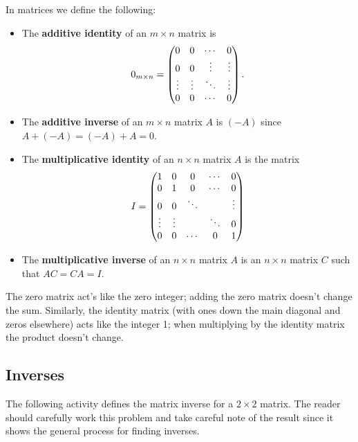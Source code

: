\begin{definition}
    In matrices we define the following:
    \begin{itemize}
        \item The {\bf additive identity} of an $m \times n$ matrix is
            \[ 0_{m\times n} = \begin{pmatrix} 0 & 0 & \cdots & 0 \\ 0 & 0 & \vdots & \vdots \\
            \vdots & \vdots & \ddots & \vdots \\ 0 & 0 & \cdots & 0 \end{pmatrix}. \]
        \item The {\bf additive inverse} of an $m \times n$ matrix $A$ is $(-A)$ since $A
            + (-A) = (-A) + A = 0$.
        \item The {\bf multiplicative identity} of an $n\times n$ matrix $A$ is the matrix 
            \[ I = \begin{pmatrix} 1 & 0 & 0 &\cdots & 0 \\ 
                        0 & 1 & 0 & \cdots & 0 \\
                        0 & 0 & \ddots &  & \vdots \\
                        \vdots & \vdots &  & \ddots & 0 \\
                        0 & 0 & \cdots & 0 & 1 \end{pmatrix} \]
        \item The {\bf multiplicative inverse} of an $n \times n$ matrix $A$ is an $n
            \times n$ matrix $C$ such that $AC = CA = I$.
    \end{itemize}
\end{definition}
The zero matrix act's like the zero integer; adding the zero matrix doesn't change the
sum.  Similarly, the identity matrix (with ones down the main diagonal and zeros
elsewhere) acts like the integer 1; when multiplying by the identity matrix the product
doesn't change.

\subsection{Inverses}
The following activity defines the matrix inverse for a $2\times 2$ matrix.  The reader
should carefully work this problem and take careful note of the result since it shows the
general process for finding inverses.

